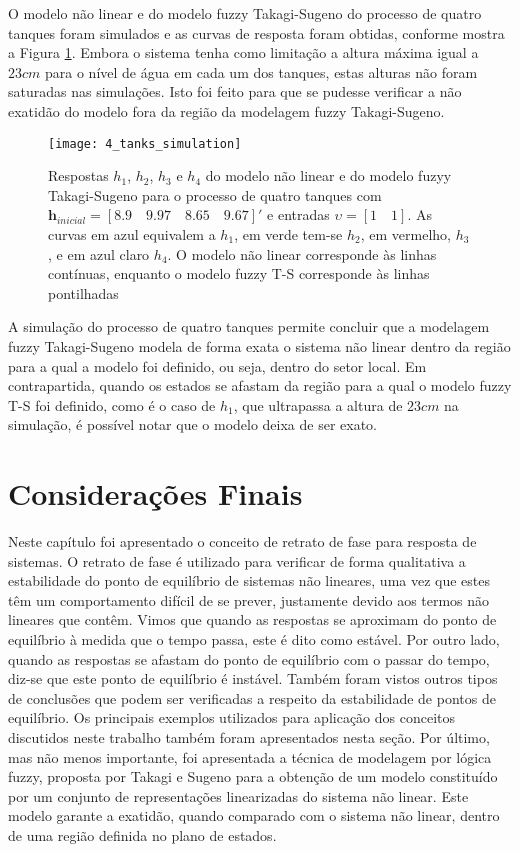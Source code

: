 O modelo não linear e do modelo fuzzy Takagi-Sugeno do processo de quatro tanques foram simulados e as curvas de resposta foram obtidas, conforme mostra a Figura \ref{fig:4_tanques_sim_TS}. Embora o sistema tenha como limitação a altura máxima igual a $23 cm$ para o nível de água em cada um dos tanques, estas alturas não foram saturadas nas simulações. Isto foi feito para que se pudesse verificar a não exatidão do modelo fora da região da modelagem fuzzy Takagi-Sugeno.
\begin{figure}[htbp]
	\centering
	\texttt{[image: 4\_tanks\_simulation]}
	\caption{Respostas $h_1$, $h_2$, $h_3$ e $h_4$ do modelo não linear e do modelo fuzyy Takagi-Sugeno para o processo de quatro tanques com $\textbf{h}_{inicial} = [8.9\quad9.97\quad8.65\quad9.67]'$ e entradas $\upsilon = [1\quad1]$. As curvas em azul equivalem a $h_1$, em verde tem-se $h_2$, em vermelho, $h_3$, e em azul claro $h_4$. O modelo não linear corresponde às linhas contínuas, enquanto o modelo fuzzy T-S corresponde às linhas pontilhadas}\label{fig:4_tanques_sim_TS}
\end{figure}

A simulação do processo de quatro tanques permite concluir que a modelagem fuzzy Takagi-Sugeno modela de forma exata o sistema não linear dentro da região para a qual a modelo foi definido, ou seja, dentro do setor local. Em contrapartida, quando os estados se afastam da região para a qual o modelo fuzzy T-S foi definido, como é o caso de $h_1$, que ultrapassa a altura de $23 cm$ na simulação, é possível notar que o modelo deixa de ser exato.

\section{Considerações Finais}\label{sec:consid_finais}
Neste capítulo foi apresentado o conceito de retrato de fase para resposta de sistemas. O retrato de fase é utilizado para verificar de forma qualitativa a estabilidade do ponto de equilíbrio de sistemas não lineares, uma vez que estes têm um comportamento difícil de se prever, justamente devido aos termos não lineares que contêm. Vimos que quando as respostas se aproximam do ponto de equilíbrio à medida que o tempo passa, este é dito como estável. Por outro lado, quando as respostas se afastam do ponto de equilíbrio com o passar do tempo, diz-se que este ponto de equilíbrio é instável. Também foram vistos outros tipos de conclusões que podem ser verificadas a respeito da estabilidade de pontos de equilíbrio.
Os principais exemplos utilizados para aplicação dos conceitos discutidos neste trabalho também foram apresentados nesta seção. Por último, mas não menos importante, foi apresentada a técnica de modelagem por lógica fuzzy, proposta por Takagi e Sugeno \cite{articlets:1985} para a obtenção de um modelo constituído por um conjunto de representações linearizadas do sistema não linear. Este modelo garante a exatidão, quando comparado com o sistema não linear, dentro de uma região definida no plano de estados.

